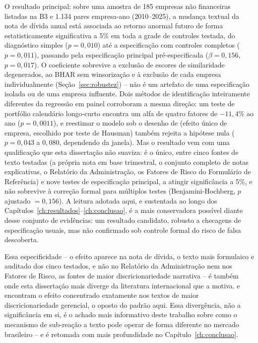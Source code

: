 \documentclass[a4paper,12pt]{report}
\begin{document}
O resultado principal: sobre uma amostra de 185 empresas não financeiras listadas na B3 e 1.134 pares empresa-ano (2010--2025), a mudança textual da nota de dívida anual está associada ao retorno anormal futuro de forma estatisticamente significativa a 5\% em toda a grade de controles testada, do diagnóstico simples ($p=0{,}010$) até a especificação com controles completos ($p=0{,}011$), passando pela especificação principal pré-especificada ($\beta=0{,}156$, $p=0{,}017$). O coeficiente sobrevive a exclusão de escores de similaridade degenerados, ao BHAR sem winsorização e à exclusão de cada empresa individualmente (Seção~\ref{sec:robustez}) -- não é um artefato de uma especificação isolada ou de uma empresa influente. Dois métodos de identificação inteiramente diferentes da regressão em painel corroboram a mesma direção: um teste de portfólio calendário longo-curto encontra um alfa de quatro fatores de $-11{,}4\%$ ao ano ($p=0{,}0011$), e reestimar o modelo sob o desenho de  (efeito único de empresa, escolhido por teste de Hausman) também rejeita a hipótese nula ($p=0{,}043$ a $0{,}080$, dependendo da janela). Mas o resultado vem com uma qualificação que esta dissertação não suaviza: é o único, entre cinco fontes de texto testadas (a própria nota em base trimestral, o conjunto completo de notas explicativas, o Relatório da Administração, os Fatores de Risco do Formulário de Referência) e nove testes de especificação principal, a atingir significância a 5\%, e não sobrevive à correção formal para múltiplos testes (Benjamini-Hochberg, $p$ ajustado $=0{,}156$). A leitura adotada aqui, e sustentada ao longo dos Capítulos~\ref{ch:resultados}--\ref{ch:conclusao}, é a mais conservadora possível diante desse conjunto de evidências: um resultado candidato, robusto a checagens de especificação usuais, mas não confirmado sob controle formal do risco de falsa descoberta.

Essa especificidade -- o efeito aparece na nota de dívida, o texto mais formulaico e auditado dos cinco testados, e não no Relatório da Administração nem nos Fatores de Risco, as fontes de maior discricionariedade narrativa -- é também onde esta dissertação mais diverge da literatura internacional que a motiva.  e  encontram o efeito concentrado exatamente nos textos de maior discricionariedade gerencial, o oposto do padrão aqui. Essa divergência, não a significância em si, é o achado mais informativo deste trabalho sobre como o mecanismo de sub-reação a texto pode operar de forma diferente no mercado brasileiro -- e é retomada com mais profundidade no Capítulo~\ref{ch:conclusao}.
\end{document}
